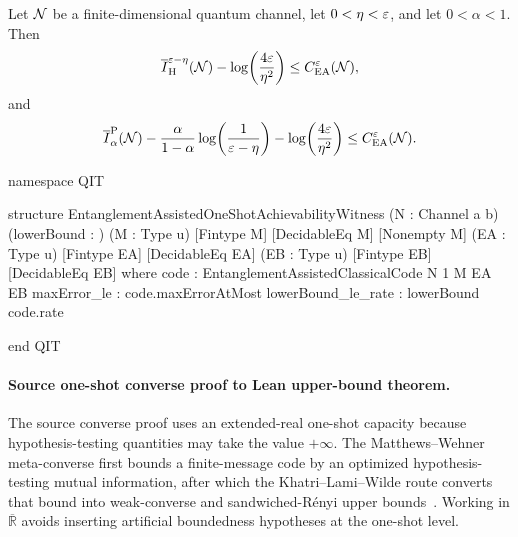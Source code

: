 \documentclass[10pt,a4paper]{article}
\begin{document}
\begin{theorem}
    \label{thm:ea-one-shot-achievability}
    Let ${\cal N}$ be a finite-dimensional quantum channel, let
    $0<\eta<\varepsilon$, and let $0<\alpha<1$.  Then
    \begin{equation}
        \overline I_{\mathrm H}^{\varepsilon-\eta}({\cal N})
        -
        \log\!\left(\frac{4\varepsilon}{\eta^2}\right)
        \le
        C_{\operatorname{EA}}^{\varepsilon}({\cal N}),
    \end{equation}
    and
    \begin{equation}
        \overline I_{\alpha}^{\mathrm P}({\cal N})
        -
        \frac{\alpha}{1-\alpha}
        \log\!\left(\frac{1}{\varepsilon-\eta}\right)
        -
        \log\!\left(\frac{4\varepsilon}{\eta^2}\right)
        \le
        C_{\operatorname{EA}}^{\varepsilon}({\cal N}).
    \end{equation}
\end{theorem}

\begin{qitleancode}[title={One-shot achievability witness}]
namespace QIT

structure EntanglementAssistedOneShotAchievabilityWitness (N : Channel a b)
    (\epsilon lowerBound : \mathbbR)
    (M : Type u) [Fintype M] [DecidableEq M] [Nonempty M]
    (EA : Type u) [Fintype EA] [DecidableEq EA]
    (EB : Type u) [Fintype EB] [DecidableEq EB] where
  code : EntanglementAssistedClassicalCode N 1 M EA EB
  maxError_le : code.maxErrorAtMost \epsilon
  lowerBound_le_rate : lowerBound \le code.rate

end QIT
\end{qitleancode}
	
\paragraph{Source one-shot converse proof to Lean upper-bound theorem.}
The source converse proof uses an extended-real one-shot capacity because
hypothesis-testing quantities may take the value $+\infty$. The Matthews--Wehner meta-converse first bounds a finite-message code by an
optimized hypothesis-testing mutual information, after which the
Khatri--Lami--Wilde route converts that bound into weak-converse and
sandwiched-R\'enyi upper bounds~\cite{MatthewsWehner2012,GuptaWilde2013,KhatriLamiWilde2025Principles}.
Working in $\overline{\mathbb R}$ avoids inserting artificial boundedness
hypotheses at the one-shot level.
	
\end{document}
